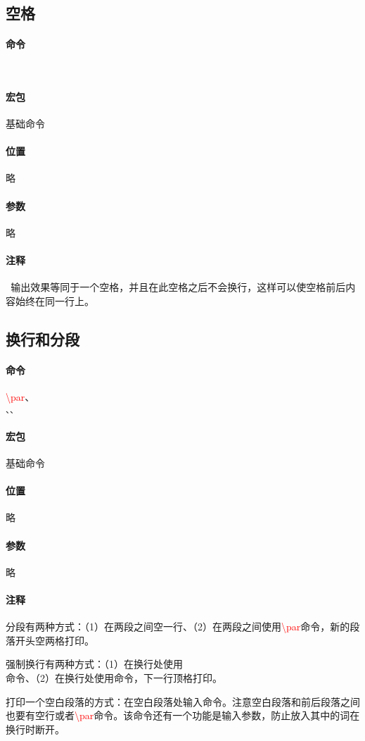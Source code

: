\documentclass{article}
\newcommand{\mnt}[1]{\texttt{#1}} %
\newcommand{\notes}[5]{
    \begin{mdframed}
        \paragraph{命令}#1
        \paragraph{宏包}#2
        \paragraph{位置}#3
        \paragraph{参数}#4
        \paragraph{注释}#5
    \end{mdframed}
}
\begin{document}
\subsection{空格}
\notes
{
    \mnt{~}
}%
{基础命令}%
{略}%
{略}%
{
    \mnt{~}输出效果等同于一个空格，并且在此空格之后不会换行，这样可以使空格前后内容始终在同一行上。
}%

\subsection{换行和分段}
\notes
{
    \textcolor{red}{\textbackslash{}par}、\mnt{\\、\newline、\mbox{}}
}%
{基础命令}%
{略}%
{略}%
{
    分段有两种方式：（1）在两段之间空一行、（2）在两段之间使用\textcolor{red}{\textbackslash{}par}命令，新的段落开头空两格打印。

    强制换行有两种方式：（1）在换行处使用\mnt{\\}命令、（2）在换行处使用\mnt{\newline}命令，下一行顶格打印。

    打印一个空白段落的方式：在空白段落处输入\mnt{\mbox{}}命令。注意空白段落和前后段落之间也要有空行或者\textcolor{red}{\textbackslash{}par}命令。该命令还有一个功能是输入参数，防止放入其中的词在换行时断开。
}%
\end{document}

